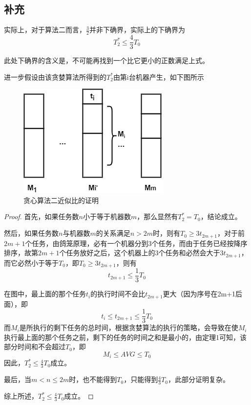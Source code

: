 \subsection{补充}
实际上，对于算法二而言，$\frac{3}{2}$并非下确界，实际上的下确界为
\begin{equation*}
	T_2^*\leq \frac{4}{3} T_0
\end{equation*}

此处下确界的含义是，不可能再找到一个比它更小的正数满足上式。

进一步假设由该贪婪算法所得到的$T_2^*$由第i台机器产生，如下图所示
\begin{figure}[hbt]
	\centering
	\includegraphics{image/greedy2-proof-4-3.jpg}
	\caption{贪心算法二近似比的证明}\label{fig:greedy2-proof-4-3}
\end{figure}

\begin{proof}
	首先，如果任务数$n$小于等于机器数$m$，那么显然有$T_2^*=T_0$，结论成立。

	然后，如果任务数$n$与机器数$m$的关系满足$n>2m$时，则有$T_0 \geq 3t_{2m+1}$，对于前$2m+1$个任务，由鸽笼原理，必有一个机器分到3个任务，而由于任务已经按降序排序，故第$2m+1$个任务放好之后，这个机器上的3个任务和必然会大于$3t_{2m+1}$，而它必然小于等于$T_0$，即$T_0 \geq 3t_{2m+1}$，则有
	\begin{equation*}
		t_{2m+1} \leq \frac{1}{3}T_0
	\end{equation*}
	
	在图中，最上面的那个任务$t_i$的执行时间不会比$t_{2m+1}$更大（因为序号在2m+1后面），即
	\begin{equation*}
		t_i \leq t_{2m+1} \leq \frac{1}{3}T_0
	\end{equation*}
	而$M_i$是所执行的剩下任务的总时间，根据贪婪算法的执行的策略，会导致在使$M_i$执行最上面的那个任务之前，剩下的任务的时间之和是最小的，由定理1可知，该部分时间和不会超过$T_0$，即
	\begin{equation*}
		M_i \leq AVG \leq T_0
	\end{equation*}
	因此，$T_2^*\leq \frac{4}{3}T_0$成立。

	最后，当$m<n \leq 2m$时，也不能得到$T_0$，只能得到$\frac{4}{3}T_0$，此部分证明复杂。

	综上所述，$T_2^*\leq \frac{4}{3}T_0$成立。
\end{proof}


